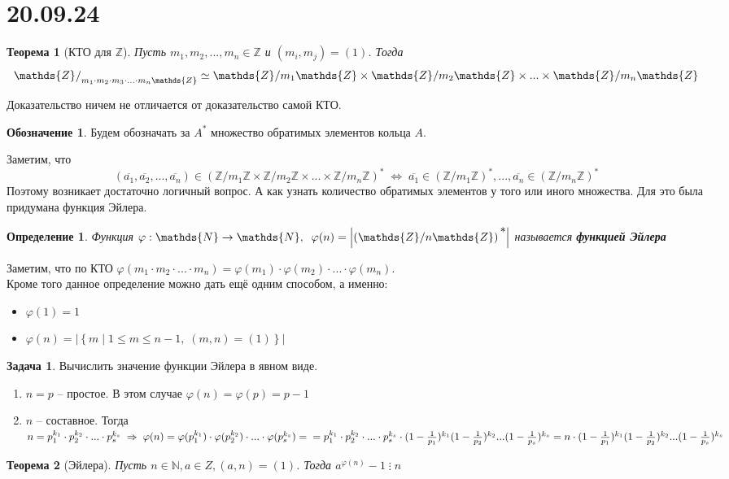 \documentclass[12pt, a4paper]{article}
\newcommand{\nat}{\mathds{N}}
\newcommand{\lra}{\Leftrightarrow}
\newcommand{\ra}{\;\Rightarrow\;}
\newcommand{\Z}{\mathds{Z}}
\newcommand{\m}{\leqslant}
\newcommand{\cl}[1]{\overline{#1}}
\theoremstyle{plain}
\newtheorem*{Th*}{Теорема}
\newtheorem{Def}{Определение}
\theoremstyle{definition}
\newtheorem*{Designation*}{Обозначение}
\newtheorem*{Problem*}{Задача}
\begin{document}
\section*{20.09.24}
\hypertarget{p1}{}
\begin{Th*}[КТО для $\Z$]
    Пусть $m_1,m_2,...,m_n\in\Z$ и $(m_i,m_j) = (1)$. Тогда 
    \[\Z\raisebox{-.1ex}{$/$}_{m_1\cdot m_2\cdot m_3\cdot...\cdot m_n\Z}\simeq\Z/m_1\Z\times\Z/m_2\Z\times...\times\Z/m_n\Z\]
\end{Th*}
\noindent Доказательство ничем не отличается от доказательство самой КТО.
\begin{Designation*}
Будем обозначать за $A^{*}$ множество обратимых элементов кольца $A$.
\end{Designation*}
\noindent Заметим, что \[(\cl{a_1},\cl{a_2},...,\cl{a_n})\in (\Z/m_1\Z\times\Z/m_2\Z\times...\times\Z/m_n\Z)^{*} \;\lra\; \cl{a_1}\in (\Z/m_1\Z)^{*}, ..., \cl{a_n}\in (\Z/m_n\Z)^{*} \]
Поэтому возникает достаточно логичный вопрос. А как узнать количество обратимых элементов у того или иного множества. Для это была придумана функция Эйлера.
\begin{Def}
    Функция $\varphi:\nat\to\nat,\;\; \varphi(n) = \left|\left(\Z/n\Z\right)\raisebox{1ex}{*}\right|$ называется \textbf{функцией Эйлера}
\end{Def}
\noindent Заметим, что по КТО $\varphi(m_1\cdot m_2\cdot...\cdot m_n) = \varphi(m_1)\cdot\varphi(m_2)\cdot...\cdot \varphi(m_n)$.
\\
Кроме того данное определение можно дать ещё одним способом, а именно:
\begin{itemize}
    \item $\varphi(1) = 1$
    \item $\varphi(n) = \big|\left\{m\;|\;1\m m \m n-1,\; (m,n) = (1)\right\}\big|$
\end{itemize}
\begin{Problem*}
    Вычислить значение функции Эйлера в явном виде.
\end{Problem*}
\begin{enumerate}
    \item $n = p$ -- простое. В этом случае $\varphi(n) = \varphi (p) = p-1$
    \item $n$ -- составное. Тогда $n = p_1^{k_1}\cdot p_2^{k_2}\cdot...\cdot p_s^{k_s} \ra \varphi(n) = \varphi(p_1^{k_1})\cdot \varphi(p_2^{k_2})\cdot...\cdot \varphi(p_s^{k_s}) = \\
     = p_1^{k_1}\cdot p_2^{k_2}\cdot...\cdot p_s^{k_s}\cdot(1 - \frac{1}{p_1})^{k_1}(1 - \frac{1}{p_2})^{k_2}...(1-\frac{1}{p_s})^{k_s} = n\cdot(1 - \frac{1}{p_1})^{k_1}(1 - \frac{1}{p_2})^{k_2}...(1-\frac{1}{p_s})^{k_s}$ 
\end{enumerate}
\begin{Th*}[Эйлера]
    Пусть $n\in\nat, a\in Z, (a,n) = (1)$. Тогда $a^{\varphi(n)}-1\;\vdots\;n$
\end{Th*}
\end{document}
